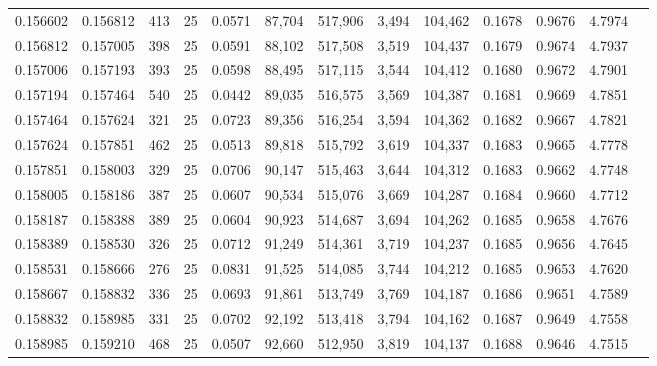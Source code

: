 \begin{tabular}{rrrrrrrrrrrrr}
0.156602 & 0.156812 &   413 &  25 &                                     0.0571 &  87,704 & 517,906 &   3,494 & 104,462 & 0.1678 & 0.9676 & 4.7974 \\
0.156812 & 0.157005 &   398 &  25 &                                     0.0591 &  88,102 & 517,508 &   3,519 & 104,437 & 0.1679 & 0.9674 & 4.7937 \\
0.157006 & 0.157193 &   393 &  25 &                                     0.0598 &  88,495 & 517,115 &   3,544 & 104,412 & 0.1680 & 0.9672 & 4.7901 \\
0.157194 & 0.157464 &   540 &  25 &                                     0.0442 &  89,035 & 516,575 &   3,569 & 104,387 & 0.1681 & 0.9669 & 4.7851 \\
0.157464 & 0.157624 &   321 &  25 &                                     0.0723 &  89,356 & 516,254 &   3,594 & 104,362 & 0.1682 & 0.9667 & 4.7821 \\
0.157624 & 0.157851 &   462 &  25 &                                     0.0513 &  89,818 & 515,792 &   3,619 & 104,337 & 0.1683 & 0.9665 & 4.7778 \\
0.157851 & 0.158003 &   329 &  25 &                                     0.0706 &  90,147 & 515,463 &   3,644 & 104,312 & 0.1683 & 0.9662 & 4.7748 \\
0.158005 & 0.158186 &   387 &  25 &                                     0.0607 &  90,534 & 515,076 &   3,669 & 104,287 & 0.1684 & 0.9660 & 4.7712 \\
0.158187 & 0.158388 &   389 &  25 &                                     0.0604 &  90,923 & 514,687 &   3,694 & 104,262 & 0.1685 & 0.9658 & 4.7676 \\
0.158389 & 0.158530 &   326 &  25 &                                     0.0712 &  91,249 & 514,361 &   3,719 & 104,237 & 0.1685 & 0.9656 & 4.7645 \\
0.158531 & 0.158666 &   276 &  25 &                                     0.0831 &  91,525 & 514,085 &   3,744 & 104,212 & 0.1685 & 0.9653 & 4.7620 \\
0.158667 & 0.158832 &   336 &  25 &                                     0.0693 &  91,861 & 513,749 &   3,769 & 104,187 & 0.1686 & 0.9651 & 4.7589 \\
0.158832 & 0.158985 &   331 &  25 &                                     0.0702 &  92,192 & 513,418 &   3,794 & 104,162 & 0.1687 & 0.9649 & 4.7558 \\
0.158985 & 0.159210 &   468 &  25 &                                     0.0507 &  92,660 & 512,950 &   3,819 & 104,137 & 0.1688 & 0.9646 & 4.7515 \\

\end{tabular}
